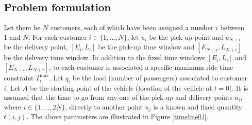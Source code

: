 \documentclass[dissertation,draft*]{aaltoseries}
\begin{document}
\subsection{Problem formulation}
\label{staticnarrow}
Let there be $N$ customers, each of which have been assigned a number $i$ between 1 and $N$.
For each customer $i \in \{1,\ldots,N\}$, let $u_i$ be the pick-up point and $u_{N+i}$ be the delivery point,
$[E_i,L_i]$ be the pick-up time window and $[E_{N+i},L_{N+i}]$ be the delivery time window. 
In addition to the fixed time windows $[E_i,L_i]$ and $[E_{N+i},L_{N+i}]$, to each 
customer is associated a specific maximum ride time constraint $T_i^{\max}$. 
Let $q_i$ be the load (number of passengers) associated to customer $i$. 
Let $A$ be the starting point of the vehicle (location of the vehicle at $t=0$).
It is assumed that the time to go from any one of the pick-up and delivery points 
$u_i$, where $i \in \{1, \ldots, 2N\}$, directly to another point $u_{j}$ is a 
known and fixed quantity $t(i,j)$.
The above parameters are illustrated in Figure \ref{timeline01}.
\end{document}
